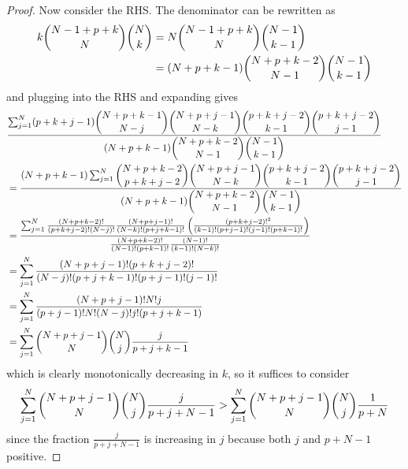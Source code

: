 \documentclass[11pt]{article}
\theoremstyle{definition}
\theoremstyle{remark}
\numberwithin{equation}{section}
\begin{document}
\begin{proof}
Now consider the RHS. The denominator can be rewritten as 
\begin{align*} 
k \dbinom{N-1+p+k}{N}\dbinom{N}{k} &= N \dbinom{N-1+p+k}{N}\dbinom{N-1}{k-1} \\ 
&= (N+p+k-1) \dbinom{N+p+k-2}{N-1} \dbinom{N-1}{k-1} 
\end{align*} and plugging into the RHS and expanding gives 
\begin{align*}
&\frac{\sum_{j=1}^N (p+k+j-1) \dbinom{N+p+k-1}{N-j} \dbinom{N+p+j-1}{N-k} \dbinom{p+k+j-2}{k-1} \dbinom{p+k+j-2}{j-1} }{ (N+p+k-1) \dbinom{N+p+k-2}{N-1} \dbinom{N-1}{k-1} }  \\
&= \frac{ (N+p+k-1)\sum_{j=1}^N  \dbinom{N+p+k-2}{p+k+j-2} \dbinom{N+p+j-1}{N-k} \dbinom{p+k+j-2}{k-1} \dbinom{p+k+j-2}{j-1} }{ (N+p+k-1) \dbinom{N+p+k-2}{N-1} \dbinom{N-1}{k-1} }  \\
&= \frac{\sum_{j=1}^N \frac{(N+p+k-2)!}{(p+k+j-2)!(N-j)!} \frac{(N+p+j-1)!}{(N-k)! (p+j+k-1)!} \left(\frac{(p+k+j-2)!^2}{(k-1)! (p+j-1)!(j-1)!(p+k-1)!}\right)}{\frac{(N+p+k-2)!}{(N-1)! (p+k-1)!} \frac{(N-1)!}{(k-1)! (N-k)!}}
\\
&= \sum_{j=1}^N \frac{(N+p+j-1)! (p+k+j-2)!}{(N-j)!(p+j+k-1)!(p+j-1)!(j-1)!}\\
&= \sum_{j=1}^N \frac{(N+p+j-1)!N! j}{(p+j-1)!N!(N-j)!j! (p+j+k-1)}\\
&= \sum_{j=1}^N \dbinom{N+p+j-1}{N} \dbinom{N}{j} \frac{j}{p+j+k-1}
\end{align*} which is clearly monotonically decreasing in $k$, so it suffices to consider 
\begin{align*}
\sum_{j=1}^N \dbinom{N+p+j-1}{N} \dbinom{N}{j} \frac{j}{p+j+N-1} > \sum_{j=1}^N \dbinom{N+p+j-1}{N} \dbinom{N}{j}\frac{1}{p+N}
\end{align*} since the fraction $\frac{j}{p+j+N-1}$ is increasing in $j$ because both $j$ and $p+N-1$ positive.
\end{proof}
\end{document}
